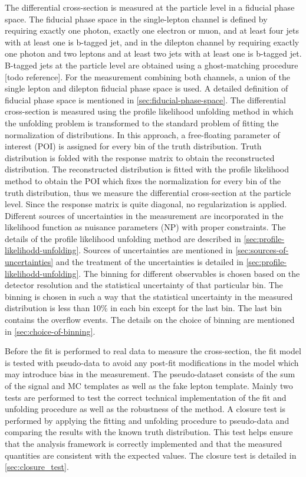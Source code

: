 The differential cross-section is measured at the particle level in a fiducial phase space. The fiducial phase space in the single-lepton channel is defined by requiring exactly one photon, exactly one electron or muon, and at least four jets with at least one is b-tagged jet, and in the dilepton channel by requiring exactly one photon and two leptons and at least two jets with at least one is b-tagged jet. B-tagged jets at the particle level are obtained using a ghost-matching procedure [todo reference]. For the measurement combining both channels, a union of the single lepton and dilepton fiducial phase space is used. A detailed definition of fiducial phase space is mentioned in \cref{sec:fiducial-phase-space}. The differential cross-section is measured using the profile likelihood unfolding method in which the unfolding problem is transformed to the standard problem of fitting the normalization of distributions. In this approach, a free-floating parameter of interest (POI) is assigned for every bin of the truth distribution. Truth distribution is folded with the response matrix to obtain the reconstructed distribution. The reconstructed distribution is fitted with the profile likelihood method to obtain the POI which fixes the normalization for every bin of the truth distribution, thus we measure the differential cross-section at the particle level. Since the response matrix is quite diagonal, no regularization is applied. Different sources of uncertainties in the measurement are incorporated in the likelihood function as nuisance parameters (NP) with proper constraints. The details of the profile likelihood unfolding method are described in \cref{sec:profile-likelihodd-unfolding}. Sources of uncertainties are mentioned in \cref{sec:sources-of-uncertainties} and the treatment of the uncertainties is detailed in \cref{sec:profile-likelihodd-unfolding}. The binning for different observables is chosen based on the detector resolution and the statistical uncertainty of that particular bin. The binning is chosen in such a way that the statistical uncertainty in the measured distribution is less than 10\% in each bin except for the last bin. The last bin contains the overflow events. The details on the choice of binning are mentioned in \cref{sec:choice-of-binning}.

Before the fit is performed to real data to measure the cross-section, the fit model is tested with pseudo-data to avoid any post-fit modifications in the model which may introduce bias in the measurement. The pseudo-dataset consists of the sum of the signal and MC templates as well as the fake lepton template. Mainly two tests are performed to test the correct technical implementation of the fit and unfolding procedure as well as the robustness of the method. A closure test is performed by applying the fitting and unfolding procedure to pseudo-data and comparing the results with the known truth distribution. This test helps ensure that the analysis framework is correctly implemented and that the measured quantities are consistent with the expected values. The closure test is detailed in \cref{sec:closure_test}.

